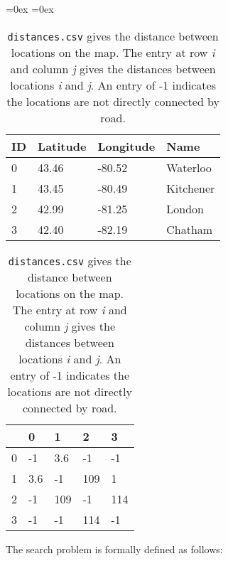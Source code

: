 \documentclass[12pt]{article}
\begin{document}
\begin{table}[!htb]
    \aboverulesep=0ex
    \belowrulesep=0ex
    \begin{minipage}{.48\linewidth}
      \centering
        \begin{tabular}{l|lll}
            ID & Latitude & Longitude & Name \\
            \midrule
            0 & 43.46 & -80.52 & Waterloo \\
            1 & 43.45 & -80.49 & Kitchener \\
            2 & 42.99 & -81.25 & London \\
            3 & 42.40 & -82.19 & Chatham \\
        \end{tabular}
        {\small
          \caption{\texttt{locations.csv} gives the latitude, longitude, and name of the destinations. The row index gives the location ID.}                  
          \label{tab:locations}}
          \vspace{40pt}
    \end{minipage}%
    \hfill
    \begin{minipage}{.48\linewidth}
      \centering
        \begin{tabular}{l|llll}
            & 0 & 1 & 2 & 3 \\
            \midrule
            0 & -1 & 3.6 & -1 & -1 \\
            1 & 3.6 & -1 & 109 & 1 \\
            2 & -1 & 109 & -1 & 114 \\
            3 & -1 & -1 & 114 & -1 \\
        \end{tabular}
        {\small \caption{\texttt{distances.csv} gives the distance between locations on the map. The entry at row \textit{i} and column \textit{j} gives the distances between locations \textit{i} and \textit{j}. An entry of -1 indicates the locations are not directly connected by road.}
        \label{tab:distances}}
    \end{minipage} 
\end{table}

The search problem is formally defined as follows:
\end{document}
